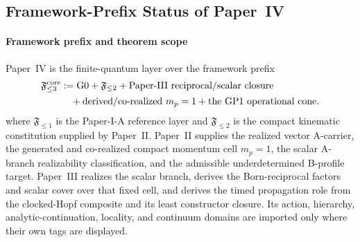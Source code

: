 \documentclass[12pt,a4paper]{article}
\begin{document}
\subsection{Framework-Prefix Status of Paper~IV}
\label{p4:sec:introduction}



\paragraph{Framework prefix and theorem scope}
\label{p4:subsec:framework-prefix-status}

Paper~IV is the finite-quantum layer over the framework prefix
\[
\begin{aligned}
\mathfrak F_{\le3}^{\rm core}
&:=
\mathrm{G0}+\mathfrak F_{\le2}
+\text{Paper-III reciprocal/scalar closure}\\
&\quad+\text{derived/co-realized }m_p=1
+\text{the GP1 operational cone}.
\end{aligned}
\]
where \(\mathfrak F_{\le1}\) is the Paper-I-A reference layer and
\(\mathfrak F_{\le2}\) is the compact kinematic constitution supplied by
Paper~II.  Paper~II supplies the realized vector A-carrier, the generated and
co-realized compact momentum cell \(m_p=1\), the scalar A-branch realizability
classification, and the admissible underdetermined B-profile target.
Paper~III realizes the scalar branch, derives the Born-reciprocal factors and
scalar cover over that fixed cell, and derives the timed propagation role from
the clocked-Hopf composite and its least constructor closure.  Its action,
hierarchy, analytic-continuation, locality, and continuum domains are imported
only where their own tags are displayed.
\end{document}
